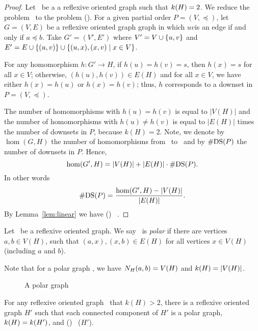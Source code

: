 \begin{proof}
Let \mH\ be a a reflexive oriented graph such that \(k(H)=2\)\@.
We reduce the problem \cdsp\ to the problem \chom(\mH)\@.
For a given partial order \(P=(V,\preceq)\), let \(G=(V,E)\) be a reflexive oriented graph
graph in which \(uv\)is an edge if and only if \(a\preceq b\)\@. Take \(G'=(V',E')\) where
\(V'= V \cup \{{u,v}\}\) and \(E' = E \cup \{{(u,v)}\} \cup
\{{(u,x),(x,v) \mid x\in V}\}\)\@.

For any homomorphism \(h: G' \to H\), if \(h(u)=h(v)=s\), then \(h(x)=s\) for all \(x\in V\);
otherwise, \((h(u),h(v))\in E(H)\) and for all \(x\in V\), we have either 
\(h(x)=h(u)\) or \(h(x)=h(v)\); thus,
\(h\) corresponds to a downset in \(P=(V,\preceq)\)\@.

The number of homomorphisms with \(h(u)=h(v)\) is equal to \(|V(H)|\) and
the number of homomorphisms with \(h(u)\neq h(v)\) is equal to \(|E(H)|\) times the 
number of downsets in \(P\), because \(k(H)=2\)\@. Note, we denote by \(\hom(G,H)\) the
number of homomorphisms from \mG\ to \mH\ and by \(\#\mathrm{DS}(P)\) the number of
downsets in \(P\)\@. Hence,
\[\hom(G',H) = |V(H)| + |E(H)|\cdot \#\mathrm{DS}(P).\]
In other words
\[\#\mathrm{DS}(P) = \frac{\hom(G',H) - |V(H)|}{|E(H)|}.\] 
By Lemma~\ref{lem:linear} we have \chom(\mH) \mapge\ \cdsp\@.
\end{proof}

\begin{defi} 
Let \mH\ be a reflexive oriented graph. We say \mH\ is \emph{polar}
if there are vertices \(a,b\in V(H)\),
such that \((a,x), (x,b) \in E(H)\) for all vertices \(x \in V(H)\) (including \(a\) and \(b\)).
\end{defi}

Note that for a polar graph \mH, we have \(N_{H}({a},{b}) = V(H)\) and \(k(H)=|V(H)|\)\@.

\begin{figure}[h]
\center{}
\caption{A polar graph}
\end{figure}

\begin{lemma} \label{lem:k-fixing}
For any reflexive oriented graph \mH\ that \(k(H) > 2\), there is a reflexive oriented graph
\(H'\) such that each connected component of \(H'\) is a
polar graph, \(k(H) = k(H')\), and
\chom(\mH) \mapge\ \chom(\(H'\)).
\end{lemma}

